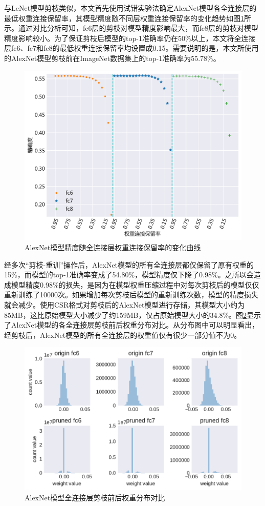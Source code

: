 与LeNet模型剪枝类似，本文首先使用试错实验法确定AlexNet模型各全连接层的最低权重连接保留率，其模型精度随不同层权重连接保留率的变化趋势如图\ref{figure:figure23}所示。通过对比分析可知，fc6层的剪枝对模型精度影响最大，而fc8层的剪枝对模型精度影响较小。为了保证剪枝后模型的top-1准确率仍在50\%以上，本文将全连接层fc6、fc7和fc8的最低权重连接保留率均设置成0.15。需要说明的是，本文所使用的AlexNet模型剪枝前在ImageNet\cite{imagenet.org}数据集上的top-1准确率为55.78\%。

\begin{figure}[htbp]
    \centering
    \includegraphics[height=0.4\textwidth]{figures/alexnet_pruned_threshold.pdf}
    \caption{AlexNet模型精度随全连接层权重连接保留率的变化曲线}\label{figure:figure23}
\end{figure}

经多次“剪枝-重训”操作后，AlexNet模型的所有全连接层都仅保留了原有权重的15\%，而模型的top-1准确率变成了54.80\%，模型精度仅下降了0.98\%。之所以会造成模型精度0.98\%的损失，是因为在模型权重压缩过程中对每次剪枝后的模型仅仅重新训练了10000次。如果增加每次剪枝后模型的重新训练次数，模型的精度损失就会减少。使用CSR格式对剪枝后的AlexNet模型进行存储，其模型大小约为85MB，这比原始模型大小减少了约159MB，仅占原始模型大小的34.8\%。图\ref{figure:figure24}显示了AlexNet模型的各全连接层剪枝前后权重分布对比。从分布图中可以明显看出，经剪枝后，AlexNet模型的所有全连接层的权重值仅有很少一部分值不为0。

\begin{figure}[htbp]
    \centering
    \includegraphics[height=0.41\textwidth]{figures/alexnet_pruned_weights.pdf}
    \caption{AlexNet模型全连接层剪枝前后权重分布对比}\label{figure:figure24}
\end{figure}


